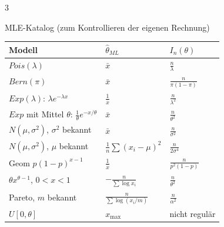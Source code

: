 \documentclass[8pt,a4paper,landscape]{extarticle}
\begin{document}
\begin{multicols*}{3}
\begin{rechnen}{MLE-Katalog (zum Kontrollieren der eigenen Rechnung)}
\begin{tabularx}{\linewidth}{@{}>{\raggedright\arraybackslash}X>{\raggedright\arraybackslash}p{2.35cm}>{\raggedright\arraybackslash}p{1.7cm}@{}}
\toprule
Modell & $\hat\theta_{ML}$ & $I_n(\theta)$ \\
\midrule
$Pois(\lambda)$ & $\bar x$ & $\frac n\lambda$ \\
$Bern(\pi)$ & $\bar x$ & $\frac{n}{\pi(1-\pi)}$ \\
$Exp(\lambda)$: $\lambda e^{-\lambda x}$ & $\frac{1}{\bar x}$ & $\frac{n}{\lambda^2}$ \\
$Exp$ mit Mittel $\theta$: $\frac1\theta e^{-x/\theta}$ & $\bar x$ & $\frac{n}{\theta^2}$ \\
$N(\mu,\sigma^2)$, $\sigma^2$ bekannt & $\bar x$ & $\frac{n}{\sigma^2}$ \\
$N(\mu,\sigma^2)$, $\mu$ bekannt & $\frac1n\sum(x_i-\mu)^2$ & $\frac{n}{2\sigma^4}$ \\
Geom $p(1-p)^{x-1}$ & $\frac{1}{\bar x}$ & $\frac{n}{p^2(1-p)}$ \\
$\theta x^{\theta-1}$, $0<x<1$ & $-\frac{n}{\sum\log x_i}$ & $\frac{n}{\theta^2}$ \\
Pareto, $m$ bekannt & $\frac{n}{\sum\log(x_i/m)}$ & $\frac{n}{\alpha^2}$ \\
$U[0,\theta]$ & $x_{\max}$ & nicht regulär \\
\bottomrule
\end{tabularx}
\end{rechnen}
\end{multicols*}
\newpage
\end{document}
